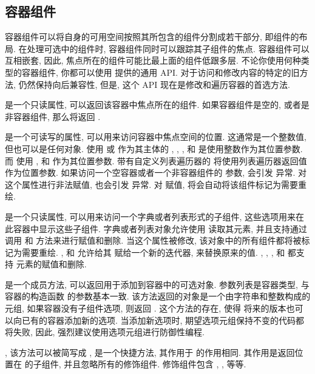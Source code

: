 \subsection{容器组件}
容器组件可以将自身的可用空间按照其所包含的组件分割成若干部分, 即组件的布局. 在处理可选中的组件时, 容器组件同时可以跟踪其子组件的焦点. 容器组件可以互相嵌套, 因此, 焦点所在的组件可能比最上面的组件低跟多层. 不论你使用何种类型的容器组件, 你都可以使用 \urwid{} 提供的通用 API. 对于访问和修改内容的特定的旧方法, 仍然保持向后兼容性, 但是, 这个 API 现在是修改和遍历容器的首选方法.

\indent{} 是一个只读属性, 可以返回该容器中焦点所在的组件. 如果容器组件是空的, 或者是非容器组件, 那么将返回 .

\indent{} 是一个可读写的属性, 可以用来访问容器中焦点空间的位置. 这通常是一个整数值, 但也可以是任何对象. 使用 或  作为其主体的 , , ,  和  是使用整数作为其位置参数. 而  使用 ,  和  作为其位置参数. 带有自定义列表遍历器的  将使用列表遍历器返回值作为位置参数. 如果访问一个空容器或者一个非容器组件的  参数, 会引发  异常. 对这个属性进行非法赋值, 也会引发  异常. 对  赋值, 将会自动将该组件标记为需要重绘.

\indent{} 是一个只读属性, 可以用来访问一个字典或者列表形式的子组件, 这些选项用来在此容器中显示这些子组件. 字典或者列表对象允许使用  读取其元素, 并且支持通过调用  和  方法来进行赋值和删除. 当这个属性被修改, 该对象中的所有组件都将被标记为需要重绘. ,  和  允许给其  赋给一个新的迭代器, 来替换原来的值. , , ,  和  都支持  元素的赋值和删除.

\indent{} 是一个成员方法, 可以返回用于添加到容器中的可选对象. 参数列表是容器类型, 与容器的构造函数  的参数基本一致. 该方法返回的对象是一个由字符串和整数构成的元组, 如果容器没有子组件选项, 则返回 . 这个方法的存在, 使得 \urwid{} 将来的版本也可以向已有的容器添加新的选项. 当添加新选项时, 期望选项元组保持不变的代码都将失败, 因此, 强烈建议使用选项元组进行防御性编程.

\indent{}, 该方法可以被简写成 , 是一个快捷方法, 其作用于  的作用相同. 其作用是返回位置在  的子组件, 并且忽略所有的修饰组件. 修饰组件包含 , ,  等等.